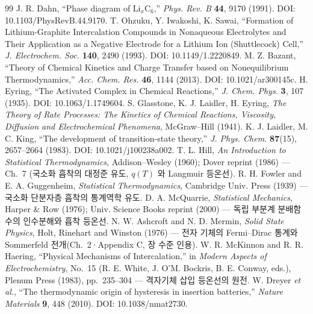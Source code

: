 \begin{thebibliography}{99}
 J. R. Dahn, ``Phase diagram of Li$_x$C$_6$,'' \emph{Phys. Rev. B} \textbf{44}, 9170 (1991). DOI: 10.1103/PhysRevB.44.9170.
 T. Ohzuku, Y. Iwakoshi, K. Sawai, ``Formation of Lithium-Graphite Intercalation Compounds in Nonaqueous Electrolytes and Their Application as a Negative Electrode for a Lithium Ion (Shuttlecock) Cell,'' \emph{J. Electrochem. Soc.} \textbf{140}, 2490 (1993). DOI: 10.1149/1.2220849.
 M. Z. Bazant, ``Theory of Chemical Kinetics and Charge Transfer based on Nonequilibrium Thermodynamics,'' \emph{Acc. Chem. Res.} \textbf{46}, 1144 (2013). DOI: 10.1021/ar300145c.
 H. Eyring, ``The Activated Complex in Chemical Reactions,'' \emph{J. Chem. Phys.} \textbf{3}, 107 (1935). DOI: 10.1063/1.1749604.
 S. Glasstone, K. J. Laidler, H. Eyring, \emph{The Theory of Rate Processes: The Kinetics of Chemical Reactions, Viscosity, Diffusion and Electrochemical Phenomena}, McGraw--Hill (1941).
 K. J. Laidler, M. C. King, ``The development of transition-state theory,'' \emph{J. Phys. Chem.} \textbf{87}(15), 2657--2664 (1983). DOI: 10.1021/j100238a002.
 T. L. Hill, \emph{An Introduction to Statistical Thermodynamics}, Addison--Wesley (1960); Dover reprint (1986) --- Ch.~7 (국소화 흡착의 대정준 유도, $q(T)$ 와 Langmuir 등온선).
 R. H. Fowler and E. A. Guggenheim, \emph{Statistical Thermodynamics}, Cambridge Univ. Press (1939) --- 국소화 단분자층 흡착의 통계역학 유도.
 D. A. McQuarrie, \emph{Statistical Mechanics}, Harper \& Row (1976); Univ. Science Books reprint (2000) --- 독립 부분계 분배함수의 인수분해와 흡착 등온선.
 N. W. Ashcroft and N. D. Mermin, \emph{Solid State Physics}, Holt, Rinehart and Winston (1976) --- 전자 기체의 Fermi--Dirac 통계와 Sommerfeld 전개(Ch.~2·Appendix C, 장 수준 인용).
 W. R. McKinnon and R. R. Haering, ``Physical Mechanisms of Intercalation,'' in \emph{Modern Aspects of Electrochemistry}, No.~15 (R. E. White, J. O'M. Bockris, B. E. Conway, eds.), Plenum Press (1983), pp.~235--304 --- 격자기체 삽입 등온선의 원전.
 W. Dreyer \emph{et al.}, ``The thermodynamic origin of hysteresis in insertion batteries,'' \emph{Nature Materials} \textbf{9}, 448 (2010). DOI: 10.1038/nmat2730.

\end{thebibliography}
